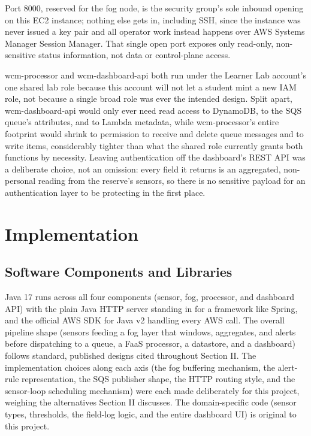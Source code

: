 \documentclass[conference,a4paper]{IEEEtran}
\begin{document}
Port 8000, reserved for the fog node, is the security group's sole inbound opening on this EC2 instance; nothing else gets in, including SSH, since the instance was never issued a key pair and all operator work instead happens over AWS Systems Manager Session Manager. That single open port exposes only read-only, non-sensitive status information, not data or control-plane access.

wcm-processor and wcm-dashboard-api both run under the Learner Lab account's one shared lab role because this account will not let a student mint a new IAM role, not because a single broad role was ever the intended design. Split apart, wcm-dashboard-api would only ever need read access to DynamoDB, to the SQS queue's attributes, and to Lambda metadata, while wcm-processor's entire footprint would shrink to permission to receive and delete queue messages and to write items, considerably tighter than what the shared role currently grants both functions by necessity. Leaving authentication off the dashboard's REST API was a deliberate choice, not an omission: every field it returns is an aggregated, non-personal reading from the reserve's sensors, so there is no sensitive payload for an authentication layer to be protecting in the first place.

\section{Implementation}

\subsection{Software Components and Libraries}

Java 17 runs across all four components (sensor, fog, processor, and dashboard API) with the plain Java HTTP server standing in for a framework like Spring, and the official AWS SDK for Java v2 handling every AWS call. The overall pipeline shape (sensors feeding a fog layer that windows, aggregates, and alerts before dispatching to a queue, a FaaS processor, a datastore, and a dashboard) follows standard, published designs cited throughout Section II. The implementation choices along each axis (the fog buffering mechanism, the alert-rule representation, the SQS publisher shape, the HTTP routing style, and the sensor-loop scheduling mechanism) were each made deliberately for this project, weighing the alternatives Section II discusses. The domain-specific code (sensor types, thresholds, the field-log logic, and the entire dashboard UI) is original to this project.
\end{document}

